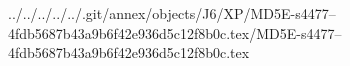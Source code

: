 ../../../../../.git/annex/objects/J6/XP/MD5E-s4477--4fdb5687b43a9b6f42e936d5c12f8b0c.tex/MD5E-s4477--4fdb5687b43a9b6f42e936d5c12f8b0c.tex